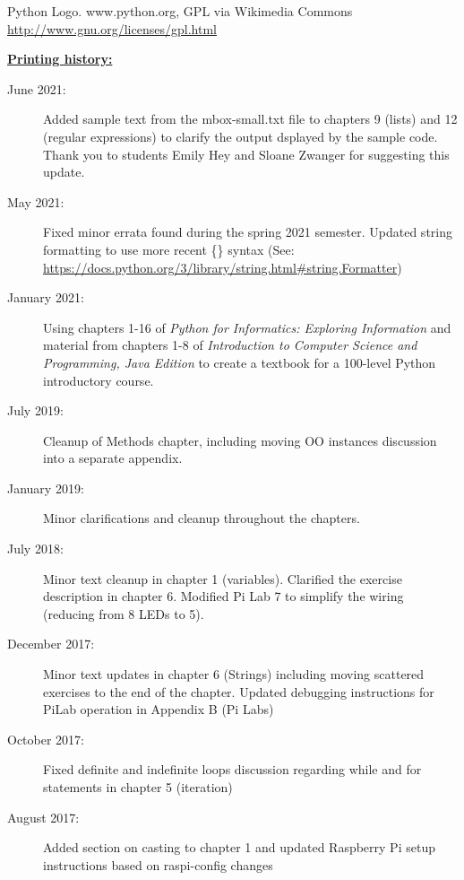 \begin{latexonly}
{Python Logo. www.python.org, GPL via Wikimedia Commons
\newline
\url{http://www.gnu.org/licenses/gpl.html} 



\underline{\textbf{Printing history:}}

\begin{description}
	
\item[June 2021:] Added sample text from the mbox-small.txt file to chapters 9 (lists) and 12 (regular expressions) to clarify the output dsplayed by the sample code. Thank you to students Emily Hey and Sloane Zwanger for suggesting this update.

\item[May 2021:] Fixed minor errata found during the spring 2021 semester. Updated string formatting to use more recent \{\} syntax (See: \url{https://docs.python.org/3/library/string.html\#string.Formatter})

\item[January 2021:] Using chapters 1-16 of \emph{Python for Informatics: Exploring Information} and material from chapters 1-8 of \emph{Introduction to Computer Science and Programming, Java Edition} to create a textbook for a 100-level Python introductory course.

\item[July 2019:] Cleanup of Methods chapter, including moving OO instances discussion into a separate appendix.

\item[January 2019:] Minor clarifications and cleanup throughout the chapters.

\item[July 2018:] Minor text cleanup in chapter 1 (variables). Clarified the exercise description in chapter 6. Modified Pi Lab 7 to simplify the wiring (reducing from 8 LEDs to 5).

\item[December 2017:] Minor text updates in chapter 6 (Strings) including moving scattered exercises to the end of the chapter. Updated debugging instructions for PiLab operation in Appendix B (Pi Labs)
	
\item[October 2017:] Fixed definite and indefinite loops discussion regarding while and for statements in chapter 5 (iteration)

\item[August 2017:] Added section on casting to chapter 1 and updated Raspberry Pi setup instructions based on raspi-config changes
	

\end{description}}
\end{latexonly}
